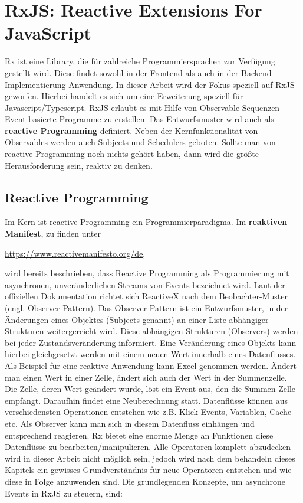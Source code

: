 \section{RxJS: Reactive Extensions For JavaScript}

Rx ist eine Library, die für zahlreiche Programmiersprachen zur Verfügung gestellt wird. Diese findet sowohl in der Frontend als auch in der Backend-Implementierung Anwendung. In dieser Arbeit wird der Fokus speziell auf RxJS geworfen. Hierbei handelt es sich um eine Erweiterung speziell für Javascript/Typescript. RxJS erlaubt es mit Hilfe von Observable-Sequenzen Event-basierte Programme zu erstellen. Das Entwurfsmuster wird auch als \textbf{reactive Programming} definiert. Neben der Kernfunktionalität von Observables werden auch Subjects und Schedulers geboten. Sollte man von reactive Programming noch nichts gehört haben, dann wird die größte Herausforderung sein, \glqq{}reaktiv\grqq{} zu denken.

\subsection{Reactive Programming}
Im Kern ist reactive Programming ein Programmierparadigma. Im \textbf{reaktiven Manifest}, zu finden unter

\begin{center}
\url{https://www.reactivemanifesto.org/de},
\end{center}

\noindent
wird bereits beschrieben, dass Reactive Programming als Programmierung mit asynchronen, unveränderlichen Streams von Events bezeichnet wird. Laut der offiziellen Dokumentation richtet sich ReactiveX nach dem Beobachter-Muster (engl. Observer-Pattern). Das Observer-Pattern ist ein Entwurfsmuster, in der Änderungen eines Objektes (Subjects genannt) an einer Liste abhängiger Strukturen weitergereicht wird. Diese abhängigen Strukturen (Observers) werden bei jeder Zustandsveränderung informiert. Eine Veränderung eines Objekts kann hierbei gleichgesetzt werden mit einem neuen Wert innerhalb eines Datenflusses. Als Beispiel für eine reaktive Anwendung kann Excel genommen werden. Ändert man einen Wert in einer Zelle, ändert sich auch der Wert in der Summenzelle. Die Zelle, deren Wert geändert wurde, löst ein Event aus, den die Summen-Zelle empfängt. Daraufhin findet eine Neuberechnung statt\cite{reactive-programming-beispiel}. Datenflüsse können aus verschiedensten Operationen entstehen wie z.B. Klick-Events, Variablen, Cache etc. Als Observer kann man sich in diesem Datenfluss einhängen und entsprechend reagieren. Rx bietet eine enorme Menge an Funktionen diese Datenflüsse zu bearbeiten/manipulieren. Alle Operatoren komplett abzudecken wird in dieser Arbeit nicht möglich sein, jedoch wird nach dem behandeln dieses Kapitels ein gewisses Grundverständnis für neue Operatoren entstehen und wie diese in Folge anzuwenden sind. Die grundlegenden Konzepte, um asynchrone Events in RxJS zu steuern, sind:

